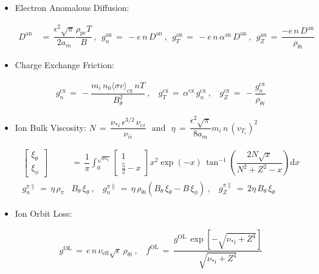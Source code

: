 \documentclass[a4paper,8pt]{article}
\providecommand{\tightlist}{%
  \setlength{\itemsep}{0pt}\setlength{\parskip}{0pt}}
\begin{document}
\begin{itemize}
\tightlist
\item
  Electron Anomalous Diffusion: \small

  \begin{align}
  D^\text{an} \,&=\, \dfrac{\epsilon^2 \sqrt{\pi}}{2 a_m} \dfrac{\rho_{pe} T}{B}~,~~ g_n^\text{an} \,=\, -e \,n\, D^\text{an}~,~~ g_T^\text{an} \,=\, -e \,n\, \alpha^\text{an}\, D^\text{an}~,~~ g_Z^\text{an} \,=\, \dfrac{-e \,n\, D^\text{an}}{\rho_{\theta i}}
  \end{align}

  \normalsize
\item
  Charge Exchange Friction: \small

  \begin{align}
  g_n^\text{cx} \,=\, -\dfrac{m_i \,n_0 \langle\sigma v\rangle_\text{cx} \,n T}{B_\theta^2}~,~~~~ g_T^\text{cx} \,=\, \alpha^\text{cx}\,g_n^\text{cx}~,~~~~ g_Z^\text{cx} \,=\, -\dfrac{g_n^\text{cx}}{\rho_{\theta i}}
  \end{align}

  \normalsize
\item
  Ion Bulk Viscosity:
  \(N \,=\, \dfrac{\nu_{*i}\,\epsilon^{3/2}\,\nu_{ei}}{\nu_{ii}} ~~~\text{and}~~~ \eta \,=\, \dfrac{\epsilon^2 \sqrt{\pi}}{8 a_m} m_i \,n\, (v_{T_i})^2\)
  \small

  \begin{align}
  \begin{bmatrix}\xi_\theta \\[1ex] \xi_\phi \end{bmatrix} \,&=\, \dfrac{1}{\pi} \int_0^{\sqrt{\nu_{*i}}} \begin{bmatrix} 1 \\[1ex] \frac{5}{2} - x \end{bmatrix} x^2 \exp(-x) \, \tan^{-1}\left(\dfrac{2 N \sqrt{x}}{N^2 + Z^2 - x}\right) \text{d}x \\
  g_n^{\pi\parallel} \,=\, \eta \, \rho_{\pi}& B_\theta \, \xi_\theta~,~~~~ g_n^{\pi\parallel} \,=\, \eta \, \rho_{\theta i} \left(B_\theta\,\xi_\theta - B\,\xi_\phi\right)~,~~~~ g_Z^{\pi\parallel} \,=\, 2\eta \, B_\theta \, \xi_\theta
  \end{align}

  \normalsize
\end{itemize}

\begin{itemize}
\tightlist
\item
  Ion Orbit Loss: \small

  \begin{align}
  g^\text{OL} \,=\, e \,n\, \nu_\text{eff} \sqrt{\epsilon} \,\rho_{\theta i}~,~~~~ f^\text{OL} \,=\, \dfrac{g^\text{OL}\,\exp\left[-\sqrt{\nu_{*i} + Z^4}\right]}{\sqrt{\nu_{*i} + Z^4}}
  \end{align}

  \normalsize
\end{itemize}
\end{document}
